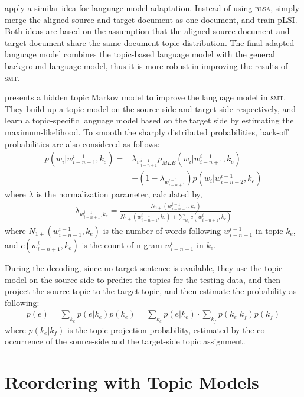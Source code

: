 \cite{Ruiz-2011} apply a similar idea for language model
adaptation. Instead of using \textsc{blsa}, \cite{Ruiz-2011} simply
merge the aligned source and target document as one document, and
train pLSI. Both ideas are
based on the assumption that the aligned source document and target
document share the same document-topic distribution. The final adapted
language model combines the topic-based language model with the
general background language model, thus it is more robust in improving
the results of \textsc{smt}.


\citet{Yu-2013} presents a hidden topic Markov model to improve
the language model in \textsc{smt}. They build up a topic model on the
source side and target side respectively, and learn a topic-specific
language model based on the target side by estimating the
maximum-likelihood. To smooth the sharply distributed probabilities,
back-off probabilities are also considered as follows:
\begin{align}
p(w_i | w^{i-1}_{i-n+1}, k_e) = &\lambda_{w^{i-1}_{i-n+1}} p_{MLE}(w_i|w^{i-1}_{i-n+1}, k_e) \\
&+ (1- \lambda_{w^{i-1}_{i-n+1}})p(w_i|w^{i-1}_{i-n+2}, k_e)
\end{align}
where $\lambda$ is the normalization parameter, calculated by,
\begin{align}
\lambda_{w^{i-1}_{i-n+1}, k_e} = \frac{N_{1+}(w^{i-1}_{i-n-1},
  k_e)}{N_{1+}(w^{i-1}_{i-n-1}, k_e) + \sum_{w_i}c(w^i_{i-n+1}, k_e)}
\end{align}
where $N_{1+}(w^{i-1}_{i-n-1}, k_e)$ is the number of words following
$w^{i-1}_{i-n-1}$ in topic $k_e$, and $c(w^i_{i-n+1}, k_e)$ is the
count of n-gram $w^i_{i-n+1}$ in $k_e$.

During the decoding, since no target sentence is available, they use
the topic model on the source side to predict the topics for the
testing data, and then project the source topic to the target topic,
and then estimate the probability as following:
\begin{align}
p(e) = \sum_{k_e} p(e|k_e) p(k_e) = \sum_{k_e} p(e|k_e) \cdot \sum_{k_f} p(k_e|k_f) p (k_f)
\end{align}
where $p(k_e|k_f)$ is the topic projection probability, estimated by
the co-occurrence of the source-side and the target-side topic
assignment.


\section{Reordering with Topic Models}


